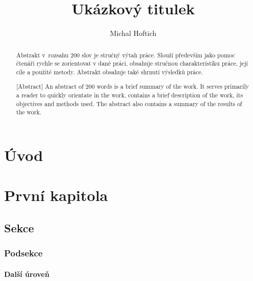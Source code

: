 \documentclass[oneside,a4paper,12pt]{book}
\author{Michal Hoftich}
\title{Ukázkový titulek}
\begin{document}
\frontmatter
{}

\begin{abstract}
Abstrakt v rozsahu 200 slov je stručný výtah práce. Slouží především jako pomoc
čtenáři rychle se zorientovat v dané práci, obsahuje stručnou charakteristiku
práce, její cíle a použité metody. Abstrakt obsahuje také shrnutí výsledků
práce.
\SavedKeywords
\end{abstract}

\begin{abstract}[Abstract]
An abstract of 200 words is a brief summary of the work. It serves primarily  
a reader to quickly orientate in the work, contains a brief description of the
work, its objectives and methods used. The abstract also contains a summary of
the results of the work.
\end{abstract}

\tableofcontents
\chapter{Úvod}
\mainmatter
\chapter{První kapitola}
\section{Sekce}
\subsection{Podsekce}
\subsubsection{Další úroveň}
\lipsum[1-3]
\end{document}
